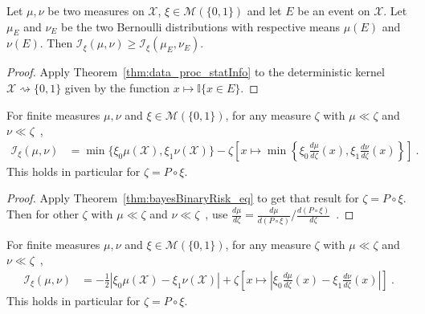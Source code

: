\begin{corollary}
  \label{cor:statInfo_data_proc_event}
  Let $\mu, \nu$ be two measures on $\mathcal X$, $\xi \in \mathcal M(\{0,1\})$ and let $E$ be an event on $\mathcal X$. Let $\mu_E$ and $\nu_E$ be the two Bernoulli distributions with respective means $\mu(E)$ and $\nu(E)$.
  Then $\mathcal I_\xi(\mu, \nu) \ge \mathcal I_\xi(\mu_E, \nu_E)$.
\end{corollary}

\begin{proof}
Apply Theorem~\ref{thm:data_proc_statInfo} to the deterministic kernel $\mathcal X \rightsquigarrow \{0,1\}$ given by the function $x \mapsto \mathbb{I}\{x \in E\}$.
\end{proof}


\begin{lemma}
  \label{lem:statInfo_eq_sub_min}
  For finite measures $\mu, \nu$ and $\xi \in \mathcal M(\{0,1\})$, for any measure $\zeta$ with $\mu \ll \zeta$ and $\nu \ll \zeta$~,
  \begin{align*}
  \mathcal I_\xi(\mu, \nu)
  &= \min\{\xi_0\mu(\mathcal X), \xi_1\nu(\mathcal X)\} - \zeta\left[x \mapsto \min \left\{\xi_0\frac{d \mu}{d\zeta}(x), \xi_1\frac{d \nu}{d\zeta}(x)\right\}\right]
  \: .
  \end{align*}
  This holds in particular for $\zeta = P \circ \xi$.
\end{lemma}

\begin{proof}%
{}
Apply Theorem~\ref{thm:bayesBinaryRisk_eq} to get that result for $\zeta = P \circ \xi$. Then for other $\zeta$ with $\mu \ll \zeta$ and $\nu \ll \zeta$~, use $\frac{d \mu}{d\zeta} = \frac{d \mu}{d(P \circ \xi)} / \frac{d (P \circ \xi)}{d\zeta}$~.
\end{proof}


\begin{lemma}
  \label{lem:statInfo_eq_integral_abs_sub}
  For finite measures $\mu, \nu$ and $\xi \in \mathcal M(\{0,1\})$, for any measure $\zeta$ with $\mu \ll \zeta$ and $\nu \ll \zeta$~,
  \begin{align*}
  \mathcal I_\xi(\mu, \nu)
  &= - \frac{1}{2} \left\vert \xi_0\mu(\mathcal X) - \xi_1\nu(\mathcal X) \right\vert + 
    \zeta\left[x \mapsto \left\vert \xi_0\frac{d \mu}{d\zeta}(x) - \xi_1\frac{d \nu}{d\zeta}(x)\right\vert\right] 
  \: .
  \end{align*}
  This holds in particular for $\zeta = P \circ \xi$.
\end{lemma}

